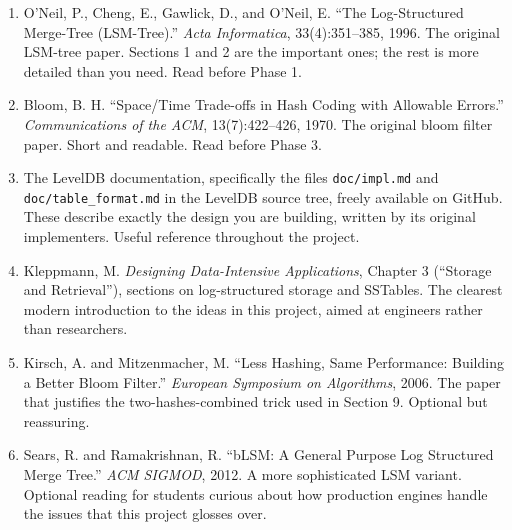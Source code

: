 \documentclass[11pt,a4paper]{article}
\begin{document}
\begin{enumerate}
\item O'Neil, P., Cheng, E., Gawlick, D., and O'Neil, E. ``The Log-Structured Merge-Tree (LSM-Tree).'' \textit{Acta Informatica}, 33(4):351--385, 1996. The original LSM-tree paper. Sections 1 and 2 are the important ones; the rest is more detailed than you need. Read before Phase 1.

\item Bloom, B. H. ``Space/Time Trade-offs in Hash Coding with Allowable Errors.'' \textit{Communications of the ACM}, 13(7):422--426, 1970. The original bloom filter paper. Short and readable. Read before Phase 3.

\item The LevelDB documentation, specifically the files \texttt{doc/impl.md} and \texttt{doc/table\_format.md} in the LevelDB source tree, freely available on GitHub. These describe exactly the design you are building, written by its original implementers. Useful reference throughout the project.

\item Kleppmann, M. \textit{Designing Data-Intensive Applications}, Chapter 3 (``Storage and Retrieval''), sections on log-structured storage and SSTables. The clearest modern introduction to the ideas in this project, aimed at engineers rather than researchers.

\item Kirsch, A. and Mitzenmacher, M. ``Less Hashing, Same Performance: Building a Better Bloom Filter.'' \textit{European Symposium on Algorithms}, 2006. The paper that justifies the two-hashes-combined trick used in Section 9. Optional but reassuring.

\item Sears, R. and Ramakrishnan, R. ``bLSM: A General Purpose Log Structured Merge Tree.'' \textit{ACM SIGMOD}, 2012. A more sophisticated LSM variant. Optional reading for students curious about how production engines handle the issues that this project glosses over.
\end{enumerate}

\footerboxes
\end{document}

